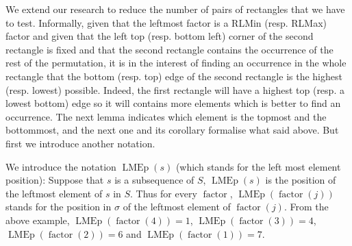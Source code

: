 \documentclass[a4paper]{llncs}
\newcounter{num}
\DeclareMathOperator{\LMEi}{LMEp}
\DeclareMathOperator{\factor}{factor}
\begin{document}
We extend our research to reduce the number of pairs of rectangles
that we have to test.
Informally,
given that the leftmost factor is a RLMin (resp. RLMax) factor and
given that the left top (resp. bottom left) corner of the second rectangle is fixed and
that the second rectangle contains the occurrence of the
rest of the permutation, it is in the interest of finding an occurrence in the whole rectangle
that the bottom (resp. top) edge of the second rectangle is the highest (resp. lowest) possible.
Indeed, the first rectangle will have
a highest top (resp. a lowest bottom) edge so it will contains more elements
which is better to find an occurrence.
The next lemma indicates which element is the topmost and the bottommost,
and the next one and its corollary formalise what said above.
But first we introduce another notation.

We introduce the notation $\LMEi(s)$ (which stands for the left most element position): Suppose that $s$ is a subsequence of $S$, $\LMEi(s)$ is the position of the leftmost element of $s$ in $S$. Thus
for every $\factor$, $\LMEi(\factor(j))$ stands for the position in $\sigma$
of the leftmost element of $\factor(j)$.
From the above example,
$\LMEi(\factor(4)) = 1$, $\LMEi(\factor(3)) = 4$, $\LMEi(\factor(2)) = 6$ and $\LMEi(\factor(1)) = 7$.

%

%
%
%
\end{document}
